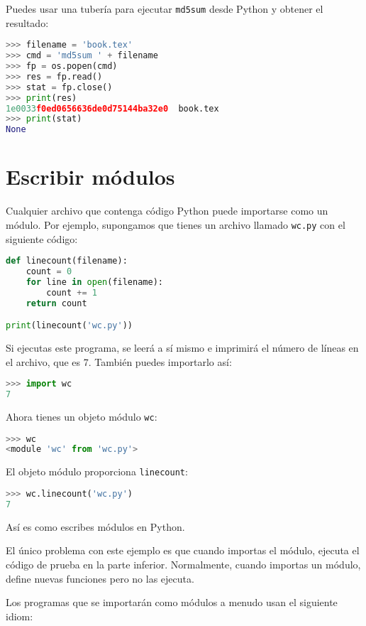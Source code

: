 Puedes usar una tubería para ejecutar \texttt{md5sum} desde Python y obtener el resultado:

\begin{lstlisting}[language=Python]
>>> filename = 'book.tex'
>>> cmd = 'md5sum ' + filename
>>> fp = os.popen(cmd)
>>> res = fp.read()
>>> stat = fp.close()
>>> print(res)
1e0033f0ed0656636de0d75144ba32e0  book.tex
>>> print(stat)
None
\end{lstlisting}

\section{Escribir módulos}

Cualquier archivo que contenga código Python puede importarse como un módulo. Por ejemplo, supongamos que tienes un archivo llamado \texttt{wc.py} con el siguiente código:

\begin{lstlisting}[language=Python]
def linecount(filename):
    count = 0
    for line in open(filename):
        count += 1
    return count

print(linecount('wc.py'))
\end{lstlisting}

Si ejecutas este programa, se leerá a sí mismo e imprimirá el número de líneas en el archivo, que es 7. También puedes importarlo así:

\begin{lstlisting}[language=Python]
>>> import wc
7
\end{lstlisting}

Ahora tienes un objeto módulo \texttt{wc}:

\begin{lstlisting}[language=Python]
>>> wc
<module 'wc' from 'wc.py'>
\end{lstlisting}

El objeto módulo proporciona \texttt{linecount}:

\begin{lstlisting}[language=Python]
>>> wc.linecount('wc.py')
7
\end{lstlisting}

Así es como escribes módulos en Python.

El único problema con este ejemplo es que cuando importas el módulo, ejecuta el código de prueba en la parte inferior. Normalmente, cuando importas un módulo, define nuevas funciones pero no las ejecuta.

Los programas que se importarán como módulos a menudo usan el siguiente idiom:

